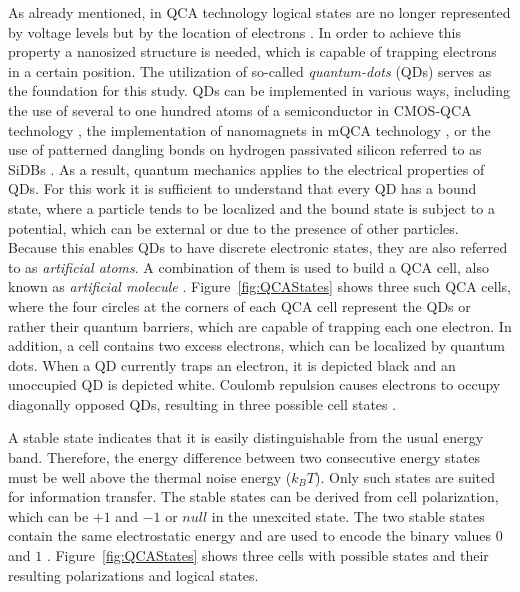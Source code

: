 As already mentioned, in QCA technology logical states are no longer represented by voltage levels but by the location of electrons \cite{QCA_technology}. In order to achieve this property a nanosized structure is needed, which is capable of trapping electrons in a certain position. The utilization of so-called \emph{quantum-dots} (QDs) serves as the foundation for this study. QDs can be implemented in various ways, including the use of several to one hundred atoms of a semiconductor in CMOS-QCA technology \cite{Quantum_dots}, the implementation of nanomagnets in mQCA technology \cite{orlov2008magnetic}, or the use of patterned dangling bonds on hydrogen passivated silicon referred to as SiDBs \cite{retallick2020population}. As a result, quantum mechanics applies to the electrical properties of QDs. For this work it is sufficient to understand that every QD has a bound state, where a particle tends to be localized and the bound state is subject to a potential, which can be external or due to the presence of other particles. Because this enables QDs to have discrete electronic states, they are also referred to as \textit{artificial atoms}. A combination of them is used to build a QCA cell, also known as \textit{artificial molecule} \cite{Quantum_dots}. Figure~\ref{fig:QCAStates} shows three such QCA cells, where the four circles at the corners of each QCA cell represent the QDs or rather their quantum barriers, which are capable of trapping each one electron. In addition, a cell contains two excess electrons, which can be localized by quantum dots. When a QD currently traps an electron, it is depicted black and an unoccupied QD is depicted white. Coulomb repulsion causes electrons to occupy diagonally opposed QDs, resulting in three possible cell states \cite{Sasamal2020QuantumDotCA, lent1997device, lent1994quantum}.

A stable state indicates that it is easily distinguishable from the usual energy band. Therefore, the energy difference between two consecutive energy states must be well above the thermal noise energy ($k_BT$). Only such states are suited for information transfer. The stable states can be derived from cell polarization, which can be $+1$ and $-1$ or $null$ in the unexcited state. The two stable states contain the same electrostatic energy and are used to encode the binary values $0$ and $1$ \cite{Sasamal2020QuantumDotCA}. Figure~\ref{fig:QCAStates} shows three cells with possible states and their resulting polarizations and logical states.


